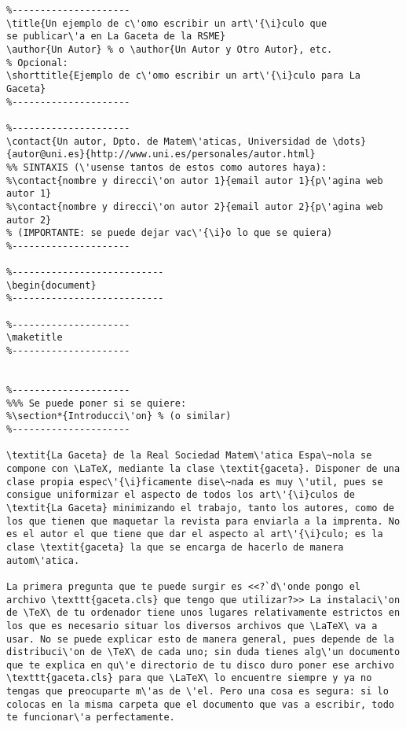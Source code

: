 \documentclass[11pt, a4paper]{article}
\begin{document}
\begin{lstlisting}
%---------------------
\title{Un ejemplo de c\'omo escribir un art\'{\i}culo que 
se publicar\'a en La Gaceta de la RSME}
\author{Un Autor} % o \author{Un Autor y Otro Autor}, etc.
% Opcional:
\shorttitle{Ejemplo de c\'omo escribir un art\'{\i}culo para La Gaceta}
%---------------------

%---------------------
\contact{Un autor, Dpto. de Matem\'aticas, Universidad de \dots}
{autor@uni.es}{http://www.uni.es/personales/autor.html}
%% SINTAXIS (\'usense tantos de estos como autores haya):
%\contact{nombre y direcci\'on autor 1}{email autor 1}{p\'agina web autor 1}
%\contact{nombre y direcci\'on autor 2}{email autor 2}{p\'agina web autor 2}
% (IMPORTANTE: se puede dejar vac\'{\i}o lo que se quiera)
%---------------------

%---------------------------
\begin{document}
%---------------------------

%---------------------
\maketitle
%---------------------


%---------------------
%%% Se puede poner si se quiere:
%\section*{Introducci\'on} % (o similar)
%---------------------

\textit{La Gaceta} de la Real Sociedad Matem\'atica Espa\~nola se compone con \LaTeX, mediante la clase \textit{gaceta}. Disponer de una clase propia espec\'{\i}ficamente dise\~nada es muy \'util, pues se consigue uniformizar el aspecto de todos los art\'{\i}culos de \textit{La Gaceta} minimizando el trabajo, tanto los autores, como de los que tienen que maquetar la revista para enviarla a la imprenta. No es el autor el que tiene que dar el aspecto al art\'{\i}culo; es la clase \textit{gaceta} la que se encarga de hacerlo de manera autom\'atica.

La primera pregunta que te puede surgir es <<?`d\'onde pongo el archivo \texttt{gaceta.cls} que tengo que utilizar?>> La instalaci\'on de \TeX\ de tu ordenador tiene unos lugares relativamente estrictos en los que es necesario situar los diversos archivos que \LaTeX\ va a usar. No se puede explicar esto de manera general, pues depende de la distribuci\'on de \TeX\ de cada uno; sin duda tienes alg\'un documento que te explica en qu\'e directorio de tu disco duro poner ese archivo \texttt{gaceta.cls} para que \LaTeX\ lo encuentre siempre y ya no tengas que preocuparte m\'as de \'el. Pero una cosa es segura: si lo colocas en la misma carpeta que el documento que vas a escribir, todo te funcionar\'a perfectamente.


\end{lstlisting}
\end{document}

